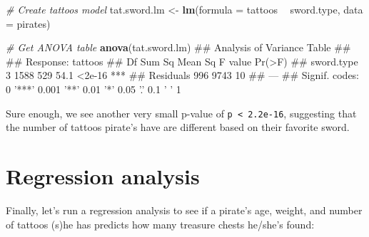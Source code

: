 \documentclass[]{book}
\newenvironment{Shaded}{\begin{snugshade}}{\end{snugshade}}
\newcommand{\KeywordTok}[1]{\textcolor[rgb]{0.13,0.29,0.53}{\textbf{#1}}}
\newcommand{\DataTypeTok}[1]{\textcolor[rgb]{0.13,0.29,0.53}{#1}}
\newcommand{\StringTok}[1]{\textcolor[rgb]{0.31,0.60,0.02}{#1}}
\newcommand{\CommentTok}[1]{\textcolor[rgb]{0.56,0.35,0.01}{\textit{#1}}}
\newcommand{\OperatorTok}[1]{\textcolor[rgb]{0.81,0.36,0.00}{\textbf{#1}}}
\newcommand{\NormalTok}[1]{#1}
\theoremstyle{definition}
\theoremstyle{definition}
\theoremstyle{remark}
\begin{document}
\begin{Shaded}
\begin{Highlighting}[]
\CommentTok{# Create tattoos model}
\NormalTok{tat.sword.lm <-}\StringTok{ }\KeywordTok{lm}\NormalTok{(}\DataTypeTok{formula =}\NormalTok{ tattoos }\OperatorTok{~}\StringTok{ }\NormalTok{sword.type,}
                   \DataTypeTok{data =}\NormalTok{ pirates)}

\CommentTok{# Get ANOVA table}
\KeywordTok{anova}\NormalTok{(tat.sword.lm)}
\NormalTok{## Analysis of Variance Table}
\NormalTok{## }
\NormalTok{## Response: tattoos}
\NormalTok{##             Df Sum Sq Mean Sq F value Pr(>F)    }
\NormalTok{## sword.type   3   1588     529    54.1 <2e-16 ***}
\NormalTok{## Residuals  996   9743      10                   }
\NormalTok{## ---}
\NormalTok{## Signif. codes:  0 '***' 0.001 '**' 0.01 '*' 0.05 '.' 0.1 ' ' 1}
\end{Highlighting}
\end{Shaded}

Sure enough, we see another very small p-value of
\texttt{p\ \textless{}\ 2.2e-16}, suggesting that the number of tattoos
pirate's have are different based on their favorite sword.

\section{Regression analysis}\label{regression-analysis}

Finally, let's run a regression analysis to see if a pirate's age,
weight, and number of tattoos (s)he has predicts how many treasure
chests he/she's found:
\end{document}

